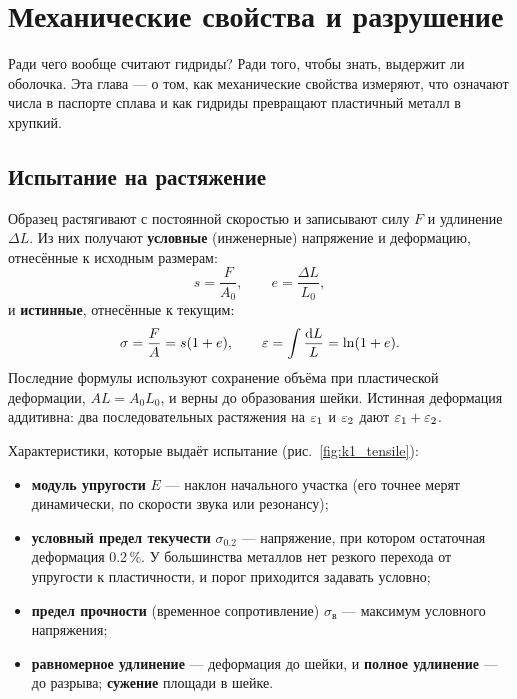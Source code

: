 \chapter{Механические свойства и разрушение}\label{ch:mech}

Ради чего вообще считают гидриды? Ради того, чтобы знать, выдержит ли оболочка. Эта глава --- о том, как
механические свойства измеряют, что означают числа в паспорте сплава и как гидриды превращают пластичный металл в
хрупкий.

\section{Испытание на растяжение}

Образец растягивают с постоянной скоростью и записывают силу $F$ и удлинение $\Delta L$. Из них получают
\textbf{условные} (инженерные) напряжение и деформацию, отнесённые к исходным размерам:
\begin{equation}
s = \frac{F}{A_0},\qquad e = \frac{\Delta L}{L_0},
\end{equation}
и \textbf{истинные}, отнесённые к текущим:
\begin{equation}
\sigma = \frac{F}{A} = s(1+e),\qquad \varepsilon = \int\frac{\mathrm{d} L}{L} = \ln(1+e).
\end{equation}
Последние формулы используют сохранение объёма при пластической деформации, $AL = A_0L_0$, и верны до образования
шейки. Истинная деформация аддитивна: два последовательных растяжения на $\varepsilon_1$ и $\varepsilon_2$ дают $\varepsilon_1 + \varepsilon_2$.


Характеристики, которые выдаёт испытание (рис.~\ref{fig:k1_tensile}):
\begin{itemize}
\item \textbf{модуль упругости} $E$ --- наклон начального участка (его точнее мерят динамически, по скорости звука или
  резонансу);
\item \textbf{условный предел текучести} $\sigma_{0.2}$ --- напряжение, при котором остаточная деформация 0.2\,\%. У
  большинства металлов нет резкого перехода от упругости к пластичности, и порог приходится задавать условно;
\item \textbf{предел прочности} (временное сопротивление) $\sigma_{\text{в}}$ --- максимум условного напряжения;
\item \textbf{равномерное удлинение} --- деформация до шейки, и \textbf{полное удлинение} --- до разрыва; \textbf{сужение}
  площади в шейке.
\end{itemize}

